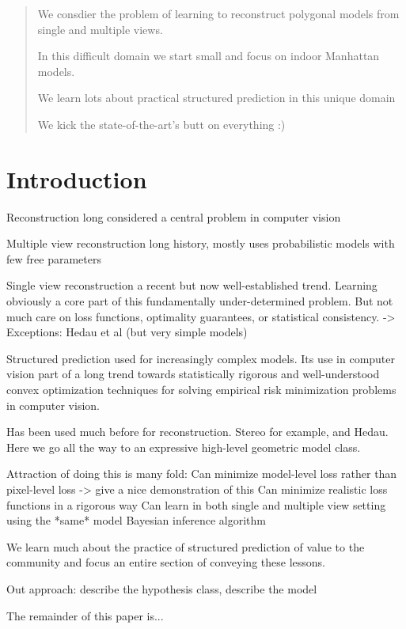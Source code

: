 \begin{abstract}
  We consdier the problem of learning to reconstruct polygonal models
  from single and multiple views.

  In this difficult domain we start small and focus on indoor
  Manhattan models.

  We learn lots about practical structured prediction in this unique
  domain

  We kick the state-of-the-art's butt on everything :)
\end{abstract}

\section{Introduction}
\label{sec:introduction}

Reconstruction long considered a central problem in computer vision

Multiple view reconstruction long history, mostly uses probabilistic
models with few free parameters

Single view reconstruction a recent but now well-established
trend. Learning obviously a core part of this fundamentally
under-determined problem. But not much care on loss functions,
optimality guarantees, or statistical consistency.
-> Exceptions: Hedau et al (but very simple models)

Structured prediction used for increasingly complex models. Its use in
computer vision part of a long trend towards statistically rigorous
and well-understood convex optimization techniques for solving
empirical risk minimization problems in computer vision.

Has been used much before for reconstruction. Stereo for example, and
Hedau. Here we go all the way to an expressive high-level geometric
model class. 

Attraction of doing this is many fold:
Can minimize model-level loss rather than pixel-level loss
-> give a nice demonstration of this
Can minimize realistic loss functions in a rigorous way
Can learn in both single and multiple view setting using the *same*
model
Bayesian inference algorithm

We learn much about the practice of structured prediction of value to
the community and focus an entire section of conveying these lessons.

Out approach: describe the hypothesis class, describe the model

The remainder of this paper is...

